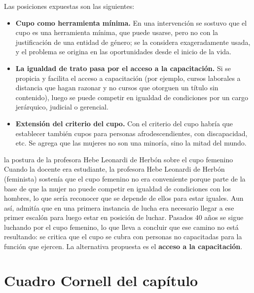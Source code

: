 \documentclass[12pt,oneside]{book}
\begin{document}
Las posiciones expuestas son las siguientes:
\begin{itemize}
    \item \textbf{Cupo como herramienta mínima.} En una intervención se sostuvo que el cupo es una herramienta mínima, que puede usarse, pero no con la justificación de una entidad de género; se la considera exageradamente usada, y el problema se origina en las oportunidades desde el inicio de la vida.
    \item \textbf{La igualdad de trato pasa por el acceso a la capacitación.} Si se propicia y facilita el acceso a capacitación (por ejemplo, cursos laborales a distancia que hagan razonar y no cursos que otorguen un título sin contenido), luego se puede competir en igualdad de condiciones por un cargo jerárquico, judicial o gerencial.
    \item \textbf{Extensión del criterio del cupo.} Con el criterio del cupo habría que establecer también cupos para personas afrodescendientes, con discapacidad, etc. Se agrega que las mujeres no son una minoría, sino la mitad del mundo.
\end{itemize}

\begin{example}{la postura de la profesora Hebe Leonardi de Herbón sobre el cupo femenino}
Cuando la docente era estudiante, la profesora Hebe Leonardi de Herbón (feminista) sostenía que el cupo femenino no era conveniente porque parte de la base de que la mujer no puede competir en igualdad de condiciones con los hombres, lo que sería reconocer que se depende de ellos para estar iguales. Aun así, admitía que en una primera instancia de lucha era necesario llegar a ese primer escalón para luego estar en posición de luchar. Pasados 40 años se sigue luchando por el cupo femenino, lo que lleva a concluir que ese camino no está resultando: se critica que el cupo se cubra con personas no capacitadas para la función que ejercen. La alternativa propuesta es el \textbf{acceso a la capacitación}.
\end{example}

\section{Cuadro Cornell del capítulo}
\end{document}
